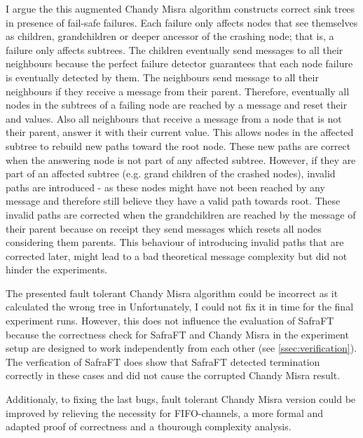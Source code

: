   I argue the this augmented Chandy Misra algorithm constructs correct sink trees in presence of fail-safe failures. 
  Each failure only affects nodes that see themselves as children, grandchildren or deeper ancessor of the crashing node; that is, a failure only affects subtrees.
  The children eventually send  messages to all their neighbours because the perfect failure detector guarantees that each node failure is eventually detected by them.
  The neighbours send  message to all their neighbours if they receive a  message from their parent. 
  Therefore, eventually all nodes in the subtrees of a failing node are reached by a  message and reset their  and  values.
  Also all neighbours that receive a  message from a node that is not their parent, answer it with their current  value.
  This allows nodes in the affected subtree to rebuild new paths toward the root node.
  These new paths are correct when the answering node is not part of any affected subtree.
  However, if they are part of an affected subtree (e.g. grand children of the crashed nodes), invalid paths are introduced - as these nodes might have not been reached by any  message and therefore still believe they have a valid path towards root.
  These invalid paths are corrected when the grandchildren are reached by the  message of their parent because on receipt they send  messages which resets all nodes considering them
  parents. 
  This behaviour of introducing invalid paths that are corrected later, might lead to a bad theoretical message complexity but did not hinder the experiments.
  
  The presented fault tolerant Chandy Misra algorithm could be incorrect as it calculated the wrong tree in %
  Unfortunately, I could not fix it in time for the final experiment runs. 
  However, this does not influence the evaluation of SafraFT because the correctness check for SafraFT and Chandy Misra in the experiment setup are designed to work independently from each other (see \cref{ssec:verification}).
  The verfication of SafraFT does show that SafraFT detected termination correctly in these cases and did not cause the corrupted Chandy Misra result.
  
  Additionaly, to fixing the last bugs, fault tolerant Chandy Misra version could be improved by relieving the necessity for FIFO-channels, a more formal and adapted proof of correctness and a thourough complexity analysis. 
  
